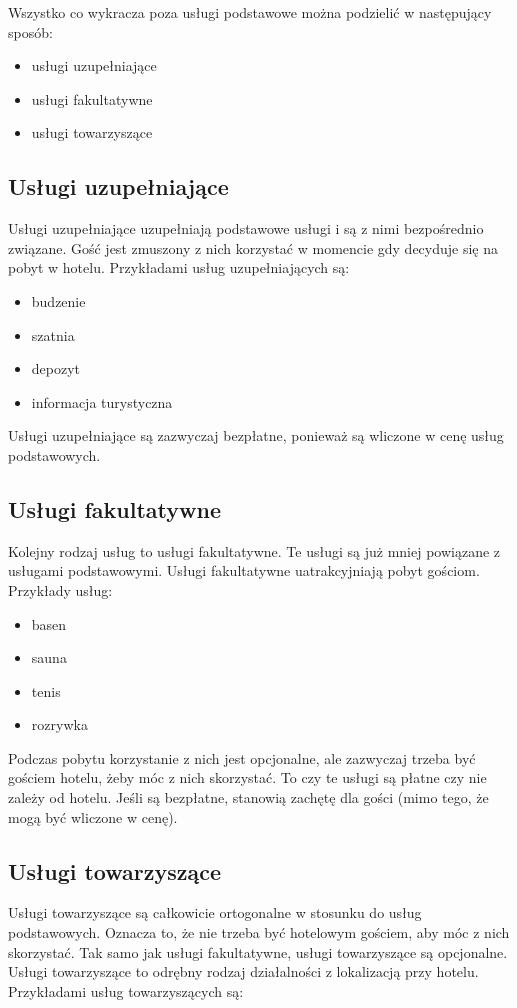 \documentclass[a4paper,onecolumn,oneside,11pt,wide,floatssmall]{mwrep}
\theoremstyle{definition}
\theoremstyle{plain}%
\theoremstyle{remark}
\begin{document}
Wszystko co wykracza poza usługi podstawowe można podzielić w następujący 
sposób:
  \begin{itemize}
    \item usługi uzupełniające
    \item usługi fakultatywne
    \item usługi towarzyszące
  \end{itemize}

\subsection{Usługi uzupełniające}
Usługi uzupełniające uzupełniają podstawowe usługi i są z nimi bezpośrednio 
związane. Gość jest zmuszony z nich korzystać w momencie gdy decyduje się na 
pobyt w hotelu. Przykładami usług uzupełniających są:

\begin{itemize}
  \item budzenie
  \item szatnia
  \item depozyt
  \item informacja turystyczna
\end{itemize}

Usługi uzupełniające są zazwyczaj bezpłatne, ponieważ są wliczone w cenę 
usług podstawowych.

\subsection{Usługi fakultatywne}
Kolejny rodzaj usług to usługi fakultatywne. Te usługi są już mniej 
powiązane z usługami podstawowymi. Usługi fakultatywne uatrakcyjniają pobyt 
gościom. Przykłady usług:

\begin{itemize}
  \item basen
  \item sauna
  \item tenis
  \item rozrywka
\end{itemize}

Podczas pobytu korzystanie z nich jest opcjonalne, ale zazwyczaj trzeba być 
gościem hotelu, żeby móc z nich skorzystać. To czy te usługi są płatne czy 
nie zależy od hotelu.  Jeśli są bezpłatne, stanowią zachętę dla gości (mimo 
tego, że mogą być wliczone w cenę).

\subsection{Usługi towarzyszące}
Usługi towarzyszące są całkowicie ortogonalne w stosunku do usług 
podstawowych. Oznacza to, że nie trzeba być hotelowym gościem, aby móc z 
nich skorzystać. Tak samo jak usługi fakultatywne, usługi towarzyszące są 
opcjonalne. Usługi towarzyszące to odrębny rodzaj działalności z lokalizacją 
przy hotelu. Przykładami usług towarzyszących są:
\end{document}
